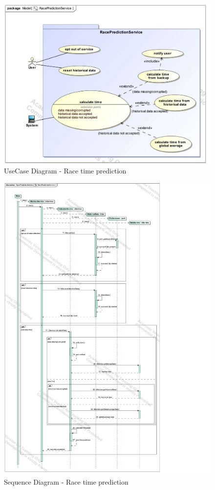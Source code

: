 \documentclass{article}
\begin{document}
		\begin{figure}[h!]
			\centering
			\captionsetup{labelformat=empty}
			\caption{UseCase Diagram - Race time prediction}
		    	\includegraphics[width=\textwidth, angle=0]{Marc/race/RacePredictionServiceUseCase.pdf}
		\end{figure}
		\clearpage
		\begin{figure}[h!]
			\centering
			\captionsetup{labelformat=empty}
			\caption{Sequence Diagram - Race time prediction}
		    	\includegraphics[scale=0.75, angle=0]{Marc/race/RacePredictionServiceSequence.pdf}
		\end{figure}
\end{document}
